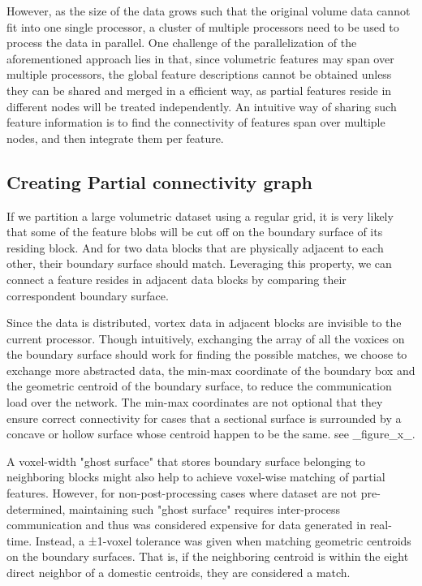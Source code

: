 \documentclass[10pt, conference, compsocconf]{IEEEtran}
\begin{document}
However, as the size of the data grows such that the original volume data cannot fit into one single processor, a cluster of multiple processors need to be used to process the data in parallel. One challenge of the parallelization of the aforementioned approach lies in that, since volumetric features may span over multiple processors, the global feature descriptions cannot be obtained unless they can be shared and merged in a efficient way, as partial features reside in different nodes will be treated independently. An intuitive way of sharing such feature information is to find the connectivity of features span over multiple nodes, and then integrate them per feature.

\subsection{Creating Partial connectivity graph}
If we partition a large volumetric dataset using a regular grid, it is very likely that some of the feature blobs will be cut off on the boundary surface of its residing block. And for two data blocks that are physically adjacent to each other, their boundary surface should match. Leveraging this property, we can connect a feature resides in adjacent data blocks by comparing their correspondent boundary surface. 

Since the data is distributed, vortex data in adjacent blocks are invisible to the current processor. Though intuitively, exchanging the array of all the voxices on the boundary surface should work for finding the possible matches, we choose to exchange more abstracted data, the min-max coordinate of the boundary box and the geometric centroid of the boundary surface, to reduce the communication load over the network. The min-max coordinates are not optional that they ensure correct connectivity for cases that a sectional surface is surrounded by a concave or hollow surface whose centroid happen to be the same. see _figure_x_. 

A voxel-width "ghost surface" that stores boundary surface belonging to neighboring blocks might also help to achieve voxel-wise matching of partial features. However, for non-post-processing cases where dataset are not pre-determined, maintaining such "ghost surface" requires inter-process communication and thus was considered expensive for data generated in real-time. Instead, a ±1-voxel tolerance was given when matching geometric centroids on the boundary surfaces. That is, if the neighboring centroid is within the eight direct neighbor of a domestic centroids, they are considered a match.
\end{document}
